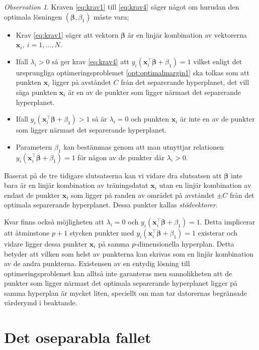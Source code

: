 \documentclass[a4paper, 12pt]{report}
\theoremstyle{definition}
\theoremstyle{remark}
\newtheorem*{rem}{Observation}
\newcommand{\bfbeta}{{\boldsymbol{\beta}}}
\begin{document}
\begin{rem}
	Kraven \ref{eq:krav1} till \ref{eq:krav4} säger något om hurudan den optimala lösningen $\left(\bfbeta,\beta_1\right)$ måste vara;
	\begin{itemize}
		\item Krav \ref{eq:krav1} säger att vektorn $\bfbeta$ är en linjär kombination av vektorerna $\mathbf{x}_i,~i=1,\dots,N$.
		\item Ifall $\lambda_i > 0$ så ger krav \ref{eq:krav4} att $y_i\left(\mathbf{x}_i^\intercal\bfbeta+\beta_1\right) = 1$ vilket enligt det ursprungliga optimeringsproblemet \ref{opt:optimalmargin1} ska tolkas som att punkten $\mathbf{x}_i$ ligger på avståndet $C$ från det separerande hyperplanet, det vill säga punkten $\mathbf{x}_i$ är en av de punkter som ligger närmast det separerande hyperplanet.
		\item Ifall $y_i\left(\mathbf{x}^\intercal_i\bfbeta + \beta_1\right) > 1$ så är $\lambda_i = 0$ och punkten $\mathbf{x}_i$ är inte en av de punkter som ligger närmast det separerande hyperplanet.
		\item Parametern $\beta_1$ kan bestämmas genom att man utnyttjar relationen $y_i\left( \mathbf{x}_i^\intercal \bfbeta + \beta_1\right) = 1$ för någon av de punkter där $\lambda_i > 0$.
	\end{itemize}
	Baserat på de tre tidigare slutsatserna kan vi vidare dra slutsatsen att $\bfbeta$ inte bara är en linjär kombination av träningsdatat $\mathbf{x}_i$ utan en linjär kombination av endast de punkter $\mathbf{x}_{i}$ som ligger på randen av området på avståndet $\pm C$ från det optimala separerande hyperplanet. Dessa punkter kallas \emph{stödvektorer}.
\end{rem}

Kvar finns också möjligheten att $\lambda_i = 0$ och $y_i\left( \mathbf{x}_i^\intercal \bfbeta + \beta_1\right) = 1$. Detta implicerar att åtminstone $p+1$ stycken punkter med $y_i\left( \mathbf{x}_i^\intercal \bfbeta + \beta_1 \right) = 1$ existerar och vidare ligger dessa punkter $\mathbf{x}_i$ på samma $p$-dimensionella hyperplan. Detta betyder att vilken som helst av punkterna kan skrivas som en linjär kombination av de andra punkterna. Existensen av en entydig lösning till optimeringsproblemet kan alltså inte garanteras men sannolikheten att de punkter som ligger närmast det optimala separerande hyperplanet ligger på samma hyperplan är mycket liten, speciellt om man tar datorernas begränsade värderymd i beaktande.

\section{Det oseparabla fallet}
\end{document}

